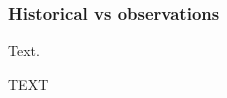 \documentclass[gmd, manuscript]{copernicus}
\begin{document}
\subsubsection{Historical vs observations}
Text.

\conclusions  %
TEXT












\appendix
\section{}    %

\subsection{}     %


\noappendix       %



\end{document}
